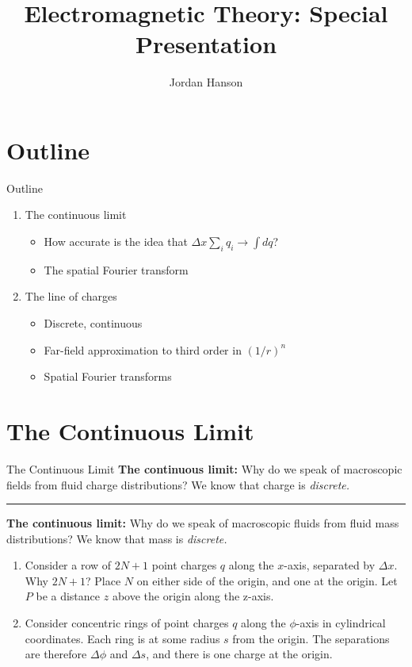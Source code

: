 \documentclass{beamer}
\title{Electromagnetic Theory: Special Presentation}
\author{Jordan Hanson}
\institute{Whittier College Department of Physics and Astronomy}
\begin{document}
\maketitle

\section{Outline}

\begin{frame}{Outline}
\begin{enumerate}
\item The continuous limit
\begin{itemize}
\item How accurate is the idea that $\Delta x \sum_i q_i \rightarrow \int dq$?
\item The spatial Fourier transform
\end{itemize}
\item The line of charges
\begin{itemize}
\item Discrete, continuous
\item Far-field approximation to third order in $(1/r)^n$
\item Spatial Fourier transforms
\end{itemize}
\end{enumerate}
\end{frame}

\section{The Continuous Limit}

\begin{frame}{The Continuous Limit}
\alert{\textbf{The continuous limit:}} Why do we speak of macroscopic fields from fluid charge distributions?  We know that charge is \textit{discrete.}
\rule{10cm}{0.25pt}
\alert{\textbf{The continuous limit:}} Why do we speak of macroscopic fluids from fluid mass distributions?  We know that mass is \textit{discrete.}
\small
\begin{enumerate}
\item Consider a row of $2N + 1$ point charges $q$ along the $x$-axis, separated by $\Delta x$.  Why $2N + 1$?  Place $N$ on either side of the origin, and one at the origin.  Let $P$ be a distance $z$ above the origin along the z-axis.
\item Consider concentric rings of point charges $q$ along the $\phi$-axis in cylindrical coordinates.  Each ring is at some radius $s$ from the origin.  The separations are therefore $\Delta \phi$ and $\Delta s$, and there is one charge at the origin.
\end{enumerate}
\end{frame}
\end{document}

